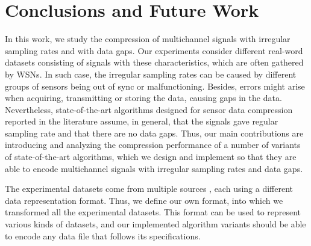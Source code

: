 
\chapter{Conclusions and Future Work} %
\label{conclusions} %



In this work, we study the compression of multichannel signals with irregular sampling rates and with data gaps. Our experiments consider different real-word datasets consisting of signals with these characteristics, which are often gathered by WSNs. In such case, the irregular sampling rates can be caused by different groups of sensors being out of sync or malfunctioning. Besides, errors might arise when acquiring, transmitting or storing the data, causing gaps in the data. Nevertheless, state-of-the-art algorithms designed for sensor data compression reported in the literature \cite{AnEva2013, Signal2016} assume, in general, that the signals gave regular sampling rate and that there are no data gaps. Thus, our main contributions are introducing and analyzing the compression performance of a number of variants of state-of-the-art algorithms, which we design and implement so that they are able to encode multichannel signals with irregular sampling rates and data gaps.


The experimental datasets come from multiple sources \dataCite, each using a different data representation format. Thus, we define our own format, into which we transformed all the experimental datasets. This format can be used to represent various kinds of datasets, and our implemented algorithm variants should be able to encode any data file that follows its specifications.




